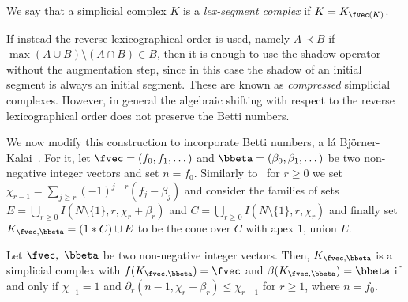 %
We say that a simplicial complex $K$ is a \emph{lex-segment complex} if $K = K_{\fvec(K)}$.
%
\begin{remark}
    If instead the reverse lexicographical order is used, namely $A\prec B$ if $\max (A\cup B)\setminus (A\cap B)\in B$, 
    then it 
    is enough to use the shadow operator without the augmentation step, since in this case the shadow of an initial segment is always an initial segment. 
    These are known as \emph{compressed} simplicial complexes.
    However, in general the algebraic shifting with respect to the reverse lexicographical order does not preserve the Betti numbers.
\end{remark}
%
We now modify this construction to incorporate Betti numbers, a l\'a  Bj\"{o}rner-Kalai~\cite{Bjorner-Kalai-ACTA}.
For it, let $\fvec=(f_0,f_1,\dots)$ and $\bbeta=(\beta_0,\beta_1,\dots)$ be two non-negative integer vectors and set $n=f_0$.
Similarly to~\cite{Bjorner-Kalai-ACTA} for $r\geq 0$ we set $\chi_{r-1}=\sum_{j\geq r}(-1)^{j-r}(f_j-\beta_j)$
and consider the families of sets $E = \bigcup_{r\geq 0} I(N\setminus \{1\},r,\chi_r+\beta_r)$ and
$C=\bigcup_{r\geq 0}I(N\setminus \{1\},r,\chi_r)$ and finally set $K_{\fvec,\bbeta} = (1*C)\cup E$
to be the cone over $C$ with apex $1$, union $E$. 
%
\begin{lemma}
\label{l:homlexsegment}
Let $\fvec,~\bbeta$ be two non-negative integer vectors.
Then, $K_{\fvec, \bbeta}$ is a simplicial complex with $f(K_{\fvec,\bbeta}) = \fvec$ and $\beta (K_{\fvec,\bbeta}) = \bbeta$
if and only if $\chi_{-1}=1$ and $\partial_r (n-1,\chi_r + \beta_r) \leq \chi_{r-1}$ for $r\geq 1$, where $n=f_0$. 
\end{lemma}
